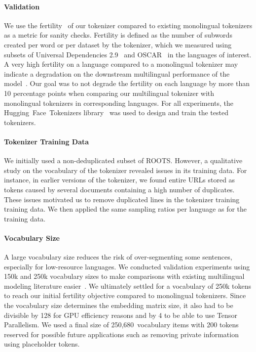 \paragraph{Validation}

We use the fertility~\citep{acs2019exploring} of our tokenizer compared to existing monolingual tokenizers as a metric for sanity checks. Fertility is defined as the number of subwords created per word or per dataset by the tokenizer, which we measured using subsets of Universal Dependencies 2.9~\citep{nivre-etal-2017-universal} and OSCAR~\citep{OSCAR} in the languages of interest. A very high fertility on a language compared to a monolingual tokenizer may indicate a degradation on the downstream multilingual performance of the model~\citep{rust-etal-2021-good}. Our goal was to not degrade the fertility on each language by more than 10 percentage points when comparing our multilingual tokenizer with monolingual tokenizers in corresponding languages. For all experiments, the Hugging~Face~Tokenizers library~\citep{hftokenizers2019} was used to design and train the tested tokenizers.

\paragraph{Tokenizer Training Data} We initially used a non-deduplicated subset of ROOTS. However, a qualitative study on the vocabulary of the tokenizer revealed issues in its training data. For instance, in earlier versions of the tokenizer, we found entire URLs stored as tokens caused by several documents containing a high number of duplicates. These issues motivated us to remove duplicated lines in the tokenizer training training data. We then applied the same sampling ratios per language as for the training data.

\paragraph{Vocabulary Size} 

A large vocabulary size reduces the risk of over-segmenting some sentences, especially for low-resource languages. We conducted validation experiments using 150k and 250k vocabulary sizes to make comparisons with existing multilingual modeling literature easier~\citep{conneau2020unsupervised,xue2021mt5}. We ultimately settled for a vocabulary of 250k tokens to reach our initial fertility objective compared to monolingual tokenizers. Since the vocabulary size determines the embedding matrix size, it also had to be divisible by 128 for GPU efficiency reasons and by 4 to be able to use Tensor Parallelism. We used a final size of 250,680~vocabulary items with 200 tokens reserved for possible future applications such as removing private information using placeholder tokens.

